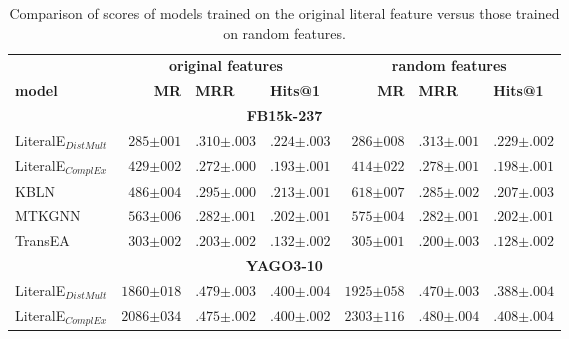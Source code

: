 
\begin{table}[]
\setlength{\tabcolsep}{6pt}
\renewcommand{\arraystretch}{1.1}

\caption{Comparison of scores of models trained on the original literal feature versus those trained on random features.}
\label{tab:org_vs_rand}
\begin{center}
\begin{tabular}{l|rll|rll}

\hline
      & \multicolumn{3}{c|}{\textbf{original features}} & \multicolumn{3}{c}{\textbf{random features}} \\
\textbf{model}      & \textbf{MR} & \textbf{MRR} & \textbf{Hits@1} & \textbf{MR}  & \textbf{MRR} & \textbf{Hits@1} \\ \hline

\hline \multicolumn{7}{c}{\textbf{FB15k-237}} \\ \hline 
LiteralE$_{DistMult}$& $285{\scriptstyle \pm 001}$ & $.310{\scriptstyle \pm .003}$ & $.224{\scriptstyle \pm .003}$ & $286{\scriptstyle \pm 008}$ & $.313{\scriptstyle \pm .001}$ & $.229{\scriptstyle \pm .002}$  \\ 
LiteralE$_{ComplEx}$& $429{\scriptstyle \pm 002}$ & $.272{\scriptstyle \pm .000}$ & $.193{\scriptstyle \pm .001}$ & $414{\scriptstyle \pm 022}$ & $.278{\scriptstyle \pm .001}$ & $.198{\scriptstyle \pm .001}$  \\ 
KBLN& $486{\scriptstyle \pm 004}$ & $.295{\scriptstyle \pm .000}$ & $.213{\scriptstyle \pm .001}$ & $618{\scriptstyle \pm 007}$ & $.285{\scriptstyle \pm .002}$ & $.207{\scriptstyle \pm .003}$  \\ 
MTKGNN& $563{\scriptstyle \pm 006}$ & $.282{\scriptstyle \pm .001}$ & $.202{\scriptstyle \pm .001}$ & $575{\scriptstyle \pm 004}$ & $.282{\scriptstyle \pm .001}$ & $.202{\scriptstyle \pm .001}$  \\ 
TransEA& $303{\scriptstyle \pm 002}$ & $.203{\scriptstyle \pm .002}$ & $.132{\scriptstyle \pm .002}$ & $305{\scriptstyle \pm 001}$ & $.200{\scriptstyle \pm .003}$ & $.128{\scriptstyle \pm .002}$  \\ 
\hline \multicolumn{7}{c}{\textbf{YAGO3-10}} \\ \hline 
LiteralE$_{DistMult}$& $1860{\scriptstyle \pm 018}$ & $.479{\scriptstyle \pm .003}$ & $.400{\scriptstyle \pm .004}$ & $1925{\scriptstyle \pm 058}$ & $.470{\scriptstyle \pm .003}$ & $.388{\scriptstyle \pm .004}$  \\ 
LiteralE$_{ComplEx}$& $2086{\scriptstyle \pm 034}$ & $.475{\scriptstyle \pm .002}$ & $.400{\scriptstyle \pm .002}$ & $2303{\scriptstyle \pm 116}$ & $.480{\scriptstyle \pm .004}$ & $.408{\scriptstyle \pm .004}$  \\ 

\end{tabular}
\end{center}
\end{table}
